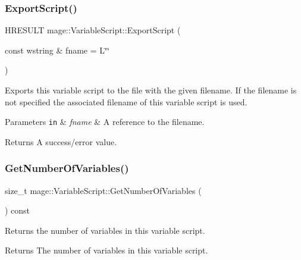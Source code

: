 \subsubsection{\texorpdfstring{Export\+Script()}{ExportScript()}}
{\footnotesize\ttfamily H\+R\+E\+S\+U\+LT mage\+::\+Variable\+Script\+::\+Export\+Script (\begin{DoxyParamCaption}\item[{const wstring \&}]{fname = {\ttfamily L\char`\"{}\char`\"{}} }\end{DoxyParamCaption})}

Exports this variable script to the file with the given filename. If the filename is not specified the associated filename of this variable script is used.


\begin{DoxyParams}[1]{Parameters}
\mbox{\tt in}  & {\em fname} & A reference to the filename. \\
\hline
\end{DoxyParams}
\begin{DoxyReturn}{Returns}
A success/error value. 
\end{DoxyReturn}
\hypertarget{classmage_1_1_variable_script_ad0bcb7dbb42f705f475c64feb1063fb4}{}\label{classmage_1_1_variable_script_ad0bcb7dbb42f705f475c64feb1063fb4} 
\subsubsection{\texorpdfstring{Get\+Number\+Of\+Variables()}{GetNumberOfVariables()}}
{\footnotesize\ttfamily size\+\_\+t mage\+::\+Variable\+Script\+::\+Get\+Number\+Of\+Variables (\begin{DoxyParamCaption}{ }\end{DoxyParamCaption}) const}

Returns the number of variables in this variable script.

\begin{DoxyReturn}{Returns}
The number of variables in this variable script. 
\end{DoxyReturn}
\hypertarget{classmage_1_1_variable_script_a231b83e1e32b882489ed90faa69f7137}{}\label{classmage_1_1_variable_script_a231b83e1e32b882489ed90faa69f7137} 
